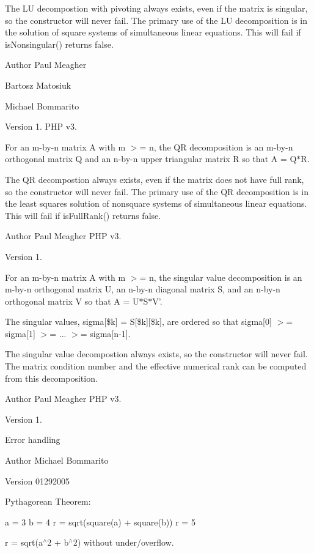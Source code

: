 The L\+U decompostion with pivoting always exists, even if the matrix is singular, so the constructor will never fail. The primary use of the L\+U decomposition is in the solution of square systems of simultaneous linear equations. This will fail if is\+Nonsingular() returns false.

\begin{DoxyAuthor}{Author}
Paul Meagher 

Bartosz Matosiuk 

Michael Bommarito 
\end{DoxyAuthor}
\begin{DoxyVersion}{Version}
1.  P\+H\+P v3.
\end{DoxyVersion}
For an m-\/by-\/n matrix A with m $>$= n, the Q\+R decomposition is an m-\/by-\/n orthogonal matrix Q and an n-\/by-\/n upper triangular matrix R so that A = Q$\ast$\+R.

The Q\+R decompostion always exists, even if the matrix does not have full rank, so the constructor will never fail. The primary use of the Q\+R decomposition is in the least squares solution of nonsquare systems of simultaneous linear equations. This will fail if is\+Full\+Rank() returns false.

\begin{DoxyAuthor}{Author}
Paul Meagher  P\+H\+P v3. 
\end{DoxyAuthor}
\begin{DoxyVersion}{Version}
1.
\end{DoxyVersion}
For an m-\/by-\/n matrix A with m $>$= n, the singular value decomposition is an m-\/by-\/n orthogonal matrix U, an n-\/by-\/n diagonal matrix S, and an n-\/by-\/n orthogonal matrix V so that A = U$\ast$\+S$\ast$\+V'.

The singular values, sigma[\$k] = S[\$k][\$k], are ordered so that sigma[0] $>$= sigma[1] $>$= ... $>$= sigma[n-\/1].

The singular value decompostion always exists, so the constructor will never fail. The matrix condition number and the effective numerical rank can be computed from this decomposition.

\begin{DoxyAuthor}{Author}
Paul Meagher  P\+H\+P v3. 
\end{DoxyAuthor}
\begin{DoxyVersion}{Version}
1.
\end{DoxyVersion}
Error handling \begin{DoxyAuthor}{Author}
Michael Bommarito 
\end{DoxyAuthor}
\begin{DoxyVersion}{Version}
01292005
\end{DoxyVersion}
Pythagorean Theorem\+:

a = 3 b = 4 r = sqrt(square(a) + square(b)) r = 5

r = sqrt(a$^\wedge$2 + b$^\wedge$2) without under/overflow. 
